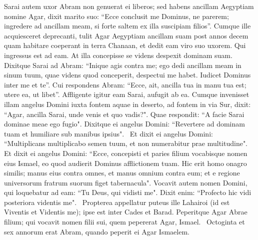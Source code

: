 \begin{biblechapter}  
\verse Sarai autem uxor Abram non genuerat ei liberos; sed habens ancillam Aegyptiam nomine Agar, 
\verse dixit marito suo: “Ecce conclusit me Dominus, ne parerem; ingredere ad ancillam meam, si forte saltem ex illa suscipiam filios”. Cumque ille acquiesceret deprecanti, 
\verse tulit Agar Aegyptiam ancillam suam post annos decem quam habitare coeperant in terra Chanaan, et dedit eam viro suo uxorem. 
\verse Qui ingressus est ad eam. At illa concepisse se videns despexit dominam suam. 
\verse Dixitque Sarai ad Abram: “Inique agis contra me; ego dedi ancillam meam in sinum tuum, quae videns quod conceperit, despectui me habet. Iudicet Dominus inter me et te”. 
\verse Cui respondens Abram: “Ecce, ait, ancilla tua in manu tua est; utere ea, ut libet”. Affligente igitur eam Sarai, aufugit ab ea. 
\verse Cumque invenisset illam angelus Domini iuxta fontem aquae in deserto, ad fontem in via Sur, 
\verse dixit: “Agar, ancilla Sarai, unde venis et quo vadis?". Quae respondit: “A facie Sarai dominae meae ego fugio". 
\verse Dixitque ei angelus Domini: “Revertere ad dominam tuam et humiliare sub manibus ipsius".  
\verse Et dixit ei angelus Domini: “Multiplicans multiplicabo semen tuum, et non numerabitur prae multitudine".  
\verse Et dixit ei angelus Domini: “Ecce, concepisti et paries filium vocabisque nomen eius Ismael, eo quod audierit Dominus afflictionem tuam. 
\verse Hic erit homo onagro similis; manus eius contra omnes, et manus omnium contra eum; et e regione universorum fratrum suorum figet tabernacula". 
\verse Vocavit autem nomen Domini, qui loquebatur ad eam: “Tu Deus, qui vidisti me". Dixit enim: “Profecto hic vidi posteriora videntis me".  
\verse Propterea appellatur puteus ille Lahairoi (id est Viventis et Videntis me); ipse est inter Cades et Barad. 
\verse Peperitque Agar Abrae filium; qui vocavit nomen filii sui, quem pepererat Agar, Ismael.  
\verse Octoginta et sex annorum erat Abram, quando peperit ei Agar Ismaelem. 
\end{biblechapter}

